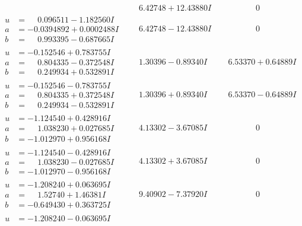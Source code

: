 \documentclass[1p]{elsarticle_modified}
\theoremstyle{definition}
\begin{document}
$$\begin{array}{c|c|c}
 & \phantom{-}6.42748 + 12.43880 I & \phantom{-0.000000 } 0 \\ \hline\begin{aligned}
u &= \phantom{-}0.096511 - 1.182560 I \\
a &= -0.0394892 + 0.0002488 I \\
b &= \phantom{-}0.993395 - 0.687665 I\end{aligned}
 & \phantom{-}6.42748 - 12.43880 I & \phantom{-0.000000 } 0 \\ \hline\begin{aligned}
u &= -0.152546 + 0.783755 I \\
a &= \phantom{-}0.804335 - 0.372548 I \\
b &= \phantom{-}0.249934 + 0.532891 I\end{aligned}
 & \phantom{-}1.30396 - 0.89340 I & \phantom{-}6.53370 + 0.64889 I \\ \hline\begin{aligned}
u &= -0.152546 - 0.783755 I \\
a &= \phantom{-}0.804335 + 0.372548 I \\
b &= \phantom{-}0.249934 - 0.532891 I\end{aligned}
 & \phantom{-}1.30396 + 0.89340 I & \phantom{-}6.53370 - 0.64889 I \\ \hline\begin{aligned}
u &= -1.124540 + 0.428916 I \\
a &= \phantom{-}1.038230 + 0.027685 I \\
b &= -1.012970 + 0.956168 I\end{aligned}
 & \phantom{-}4.13302 - 3.67085 I & \phantom{-0.000000 } 0 \\ \hline\begin{aligned}
u &= -1.124540 - 0.428916 I \\
a &= \phantom{-}1.038230 - 0.027685 I \\
b &= -1.012970 - 0.956168 I\end{aligned}
 & \phantom{-}4.13302 + 3.67085 I & \phantom{-0.000000 } 0 \\ \hline\begin{aligned}
u &= -1.208240 + 0.063695 I \\
a &= \phantom{-}1.52740 + 1.46381 I \\
b &= -0.649430 + 0.363725 I\end{aligned}
 & \phantom{-}9.40902 - 7.37920 I & \phantom{-0.000000 } 0 \\ \hline\begin{aligned}
u &= -1.208240 - 0.063695 I \\

\end{aligned}
\end{array}$$
\end{document}
